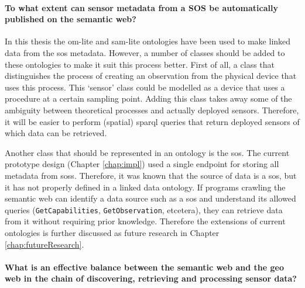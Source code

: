 \paragraph{To what extent can sensor metadata from a SOS be automatically published on the semantic web?}\mbox{}

In this thesis the om-lite and sam-lite ontologies have been used to make linked data from the \ac{sos} metadata. However, a number of classes should be added to these ontologies to make it suit this process better. First of all, a class that distinguishes the process of creating an observation from the physical device that uses this process. This `sensor' class could be modelled as a device that uses a procedure at a certain sampling point. Adding this class takes away some of the ambiguity between theoretical processes and actually deployed sensors. Therefore, it will be easier to perform (spatial) \ac{sparql} queries that return deployed sensors of which data can be retrieved.  

Another class that should be represented in an ontology is the \acl{sos}. The current prototype design (Chapter \ref{chap:impl}) used a single endpoint for storing all metadata from \aclp{sos}. Therefore, it was known that the source of data is a \ac{sos}, but it has not properly defined in a linked data ontology. If programs crawling the semantic web can identify a data source such as a \ac{sos} and understand its allowed queries (\texttt{GetCapabilities}, \texttt{GetObservation}, etcetera), they can retrieve data from it without requiring prior knowledge. Therefore the extensions of current ontologies is further discussed as future research in Chapter \ref{chap:futureResearch}.  


\paragraph{What is an effective balance between the semantic web and the geo web in the chain of discovering, retrieving and processing sensor data?}\mbox{}

